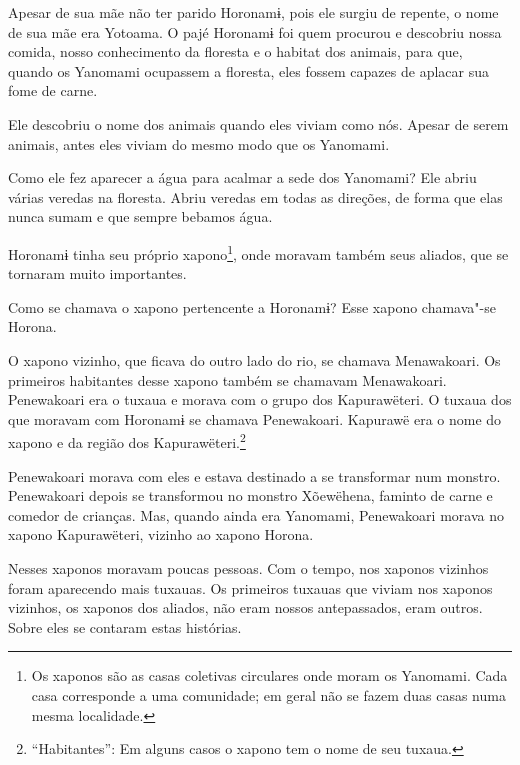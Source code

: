 Apesar de sua mãe não ter parido Horonamɨ, pois ele surgiu de repente, o
nome de sua mãe era Yotoama. O pajé Horonamɨ foi quem procurou e
descobriu nossa comida, nosso conhecimento da floresta e o habitat dos
animais, para que, quando os Yanomami ocupassem a floresta, eles fossem
capazes de aplacar sua fome de carne. 

Ele descobriu o nome dos animais quando eles viviam como nós. Apesar de
serem animais, antes eles viviam do mesmo modo que os Yanomami. 

Como ele fez aparecer a água para acalmar a sede dos Yanomami? Ele abriu
várias veredas na floresta. Abriu veredas em todas as direções, de forma
que elas nunca sumam e que sempre bebamos água. 

Horonamɨ tinha seu próprio xapono\footnote{  Os xaponos são as casas coletivas circulares onde moram os Yanomami. Cada
casa corresponde a uma comunidade; em geral não se fazem duas casas numa
mesma localidade.}, onde moravam
também seus aliados, que se tornaram muito importantes. 

Como se chamava o xapono pertencente a Horonamɨ? Esse xapono chamava"-se
Horona. 

O xapono vizinho, que ficava do outro lado do rio, se chamava
Menawakoari. Os primeiros habitantes desse xapono\emph{ }também se
chamavam Menawakoari. Penewakoari era o tuxaua e morava com o grupo dos
Kapurawëteri. O tuxaua dos que moravam com Horonamɨ se chamava
Penewakoari. Kapurawë era o nome do xapono\emph{ }e da região dos
Kapurawëteri.\footnote{  ``Habitantes'': Em alguns casos o xapono tem o nome de seu tuxaua.}

Penewakoari morava com eles e estava destinado a se transformar num
monstro. Penewakoari depois se transformou no monstro Xõewëhena, faminto
de carne e comedor de crianças. Mas, quando ainda era Yanomami,
Penewakoari morava no xapono Kapurawëteri, vizinho ao
xapono\emph{ }Horona.

Nesses xaponos moravam poucas pessoas. Com o tempo, nos xaponos vizinhos
foram aparecendo mais tuxauas. Os primeiros tuxauas que viviam nos
xaponos\emph{ }vizinhos, os xaponos dos aliados, não eram nossos
antepassados, eram outros. Sobre eles se contaram estas histórias.